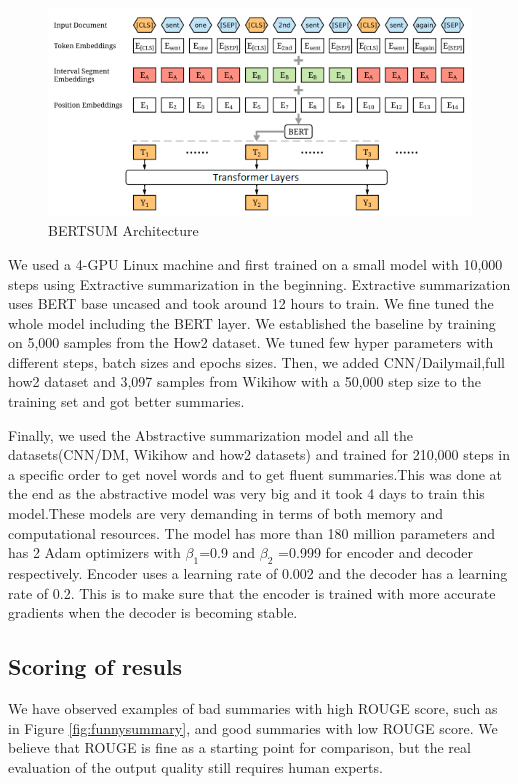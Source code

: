 \documentclass{article}
\begin{document}
\begin{figure}[H]
  \centering
  \includegraphics[scale=0.5]{bertsumarchitecture.png}
  \caption{BERTSUM Architecture}
  \label{fig:architecure}
\end{figure}

We used a 4-GPU Linux machine and first trained on a small model with 10,000 steps using Extractive summarization in the beginning. Extractive summarization uses BERT base uncased and took around 12 hours to train. We fine tuned the whole model including the BERT layer. We established the baseline by training on 5,000 samples from the How2 dataset. We tuned few hyper parameters with different steps, batch sizes and epochs sizes. Then, we added CNN/Dailymail,full how2 dataset and 3,097 samples from Wikihow with a 50,000 step size to the training set and got better summaries. 

Finally, we used the Abstractive summarization model and all the datasets(CNN/DM, Wikihow and how2 datasets) and trained for 210,000 steps in a specific order to get novel words and to get fluent summaries.This was done at the end as the abstractive model was very big and it took 4 days to train this model.These models are very demanding in terms of both memory and computational resources. The model has more than 180 million parameters and has 2 Adam optimizers with $\beta_1$=0.9 and $\beta_2$ =0.999 for encoder and decoder respectively. Encoder uses a learning rate of 0.002 and the decoder has a learning rate of 0.2. This is to make sure that the encoder is trained with more accurate gradients when the decoder is becoming stable.

\subsection{Scoring of resuls}
We have observed examples of bad summaries with high ROUGE score, such as in Figure \ref{fig:funnysummary}, and good summaries with low ROUGE score. We believe that ROUGE is fine as a starting point for comparison, but the real evaluation of the output quality still requires human experts.
\end{document}
